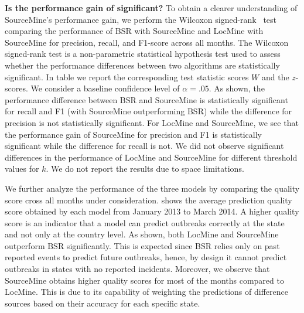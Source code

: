 \documentclass[conference]{IEEEtran}
\newcommand{\fullmodel}{{{\sf SourceMine}}\xspace}
\newcommand{\locationmodel}{{\sf LocMine}\xspace}
\begin{document}
\noindent\textbf{Is the performance gain of {} significant?} To obtain a clearer understanding of \fullmodel's performance gain, we perform the Wilcoxon signed-rank~\cite{Wilcoxon45} test comparing the performance of  BSR with \fullmodel and \locationmodel with \fullmodel for precision, recall, and F1-score across all months. The Wilcoxon signed-rank test is a non-parametric statistical hypothesis test used to assess whether the performance differences between two algorithms are statistically significant. In table  we report the corresponding test statistic scores $W$ and the $z$-scores. We consider a baseline confidence level of $\alpha = .05$. As shown, the performance difference between BSR and \fullmodel is statistically significant for recall and F1 (with \fullmodel outperforming BSR) while the difference for precision is not statistically significant. For \locationmodel and \fullmodel, we see that the performance gain of \fullmodel for precision and F1 is statistically significant while the difference for recall is not. We did not observe significant differences in the performance of \locationmodel and \fullmodel for different threshold values for $k$. We do not report the results due to space limitations.

We further analyze the performance of the three models by comparing the quality score cross all months under consideration.  shows the average prediction quality score obtained by each model from January 2013 to March 2014. A higher quality score is an indicator that a model can predict outbreaks correctly at the state and not only at the country level. As shown, both \locationmodel and \fullmodel outperform BSR significantly. This is expected since BSR relies only on past reported events to predict future outbreaks, hence, by design it cannot predict outbreaks in states with no reported incidents. Moreover, we observe that \fullmodel obtains higher quality scores for most of the months compared to \locationmodel. This is due to its capability of weighting the predictions of difference sources  based on their accuracy for each specific state.
\end{document}
